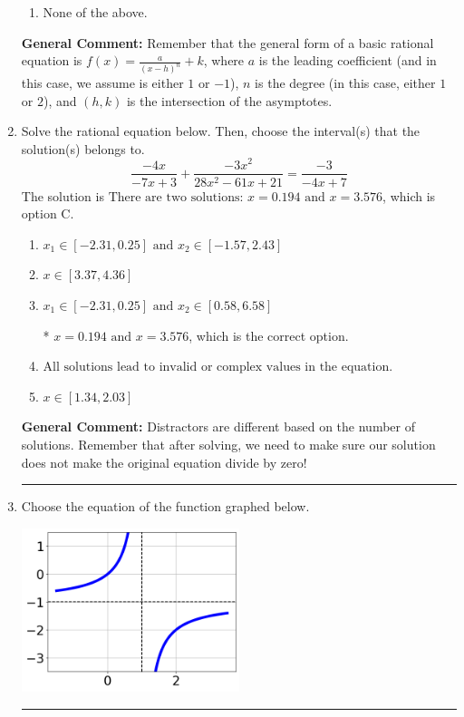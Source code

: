 \documentclass{extbook}[14pt]
\newcommand{\litem}[1]{\item #1

\rule{\textwidth}{0.4pt}}
\begin{document}
\begin{enumerate}
{\begin{enumerate}[label=\Alph*.]
\item None of the above.\end{enumerate}
\textbf{General Comment:} Remember that the general form of a basic rational equation is $ f(x) = \frac{a}{(x-h)^n} + k$, where $a$ is the leading coefficient (and in this case, we assume is either $1$ or $-1$), $n$ is the degree (in this case, either $1$ or $2$), and $(h, k)$ is the intersection of the asymptotes.
}
\litem{
Solve the rational equation below. Then, choose the interval(s) that the solution(s) belongs to.
\[ \frac{-4x}{-7x + 3} + \frac{-3x^{2}}{28x^{2} -61 x + 21} = \frac{-3}{-4x + 7} \]
The solution is \( \text{There are two solutions: } x = 0.194 \text{ and } x = 3.576 \), which is option C.\begin{enumerate}[label=\Alph*.]
\item \( x_1 \in [-2.31, 0.25] \text{ and } x_2 \in [-1.57,2.43] \)


\item \( x \in [3.37,4.36] \)


\item \( x_1 \in [-2.31, 0.25] \text{ and } x_2 \in [0.58,6.58] \)

* $x = 0.194 \text{ and } x = 3.576$, which is the correct option.
\item \( \text{All solutions lead to invalid or complex values in the equation.} \)


\item \( x \in [1.34,2.03] \)


\end{enumerate}

\textbf{General Comment:} Distractors are different based on the number of solutions. Remember that after solving, we need to make sure our solution does not make the original equation divide by zero!
}
\litem{
Choose the equation of the function graphed below.

\begin{center}
    \includegraphics[width=0.5\textwidth]{../Figures/rationalGraphToEquationC.png}
\end{center}



}
\end{enumerate}
\end{document}

